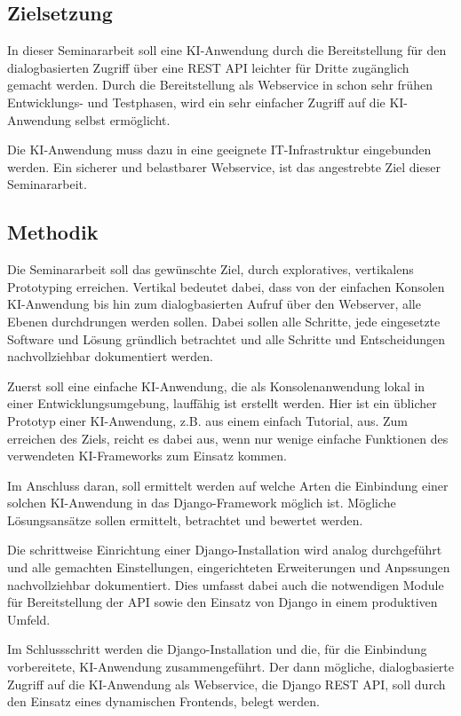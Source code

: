 \documentclass[12pt,oneside,titlepage,listof=totoc,bibliography=totoc]{scrartcl}
\begin{document}
\subsection{Zielsetzung}

In dieser Seminararbeit soll eine \ac{KI}-Anwendung durch die Bereitstellung für den dialogbasierten Zugriff über eine REST API leichter für Dritte zugänglich gemacht werden. Durch die Bereitstellung als Webservice in schon sehr frühen Entwicklungs- und Testphasen, wird ein sehr einfacher Zugriff auf die KI-Anwendung selbst ermöglicht. 

Die \ac{KI}-Anwendung muss dazu in eine geeignete IT-Infrastruktur eingebunden werden. Ein sicherer und belastbarer Webservice, ist das angestrebte Ziel dieser Seminararbeit. 


\subsection{Methodik}

Die Seminararbeit soll das gewünschte Ziel, durch exploratives, vertikalens Prototyping erreichen. Vertikal bedeutet dabei, dass von der einfachen Konsolen KI-Anwendung bis hin zum dialogbasierten Aufruf über den Webserver, alle Ebenen durchdrungen werden sollen. Dabei sollen alle Schritte, jede eingesetzte Software und Lösung gründlich betrachtet und alle Schritte und Entscheidungen nachvollziehbar dokumentiert werden.

Zuerst soll eine einfache KI-Anwendung, die als Konsolenanwendung lokal in einer Entwicklungsumgebung, lauffähig ist erstellt werden. Hier ist ein üblicher Prototyp einer KI-Anwendung, z.B. aus einem einfach Tutorial, aus. Zum erreichen des Ziels, reicht es dabei aus, wenn nur wenige einfache Funktionen des verwendeten KI-Frameworks zum Einsatz kommen.

Im Anschluss daran, soll ermittelt werden auf welche Arten die Einbindung einer solchen KI-Anwendung in das Django-Framework möglich ist. Mögliche Lösungsansätze sollen ermittelt, betrachtet und bewertet werden. 

Die schrittweise Einrichtung einer Django-Installation wird analog durchgeführt und alle gemachten Einstellungen, eingerichteten Erweiterungen und Anpssungen nachvollziehbar dokumentiert. Dies umfasst dabei auch die notwendigen Module für Bereitstellung der API sowie den Einsatz von Django in einem produktiven Umfeld. 

Im Schlussschritt werden die Django-Installation und die, für die Einbindung vorbereitete, KI-Anwendung zusammengeführt. Der dann mögliche, dialogbasierte Zugriff auf die KI-Anwendung als Webservice, die Django REST API, soll durch den Einsatz eines dynamischen Frontends, belegt werden. 
\end{document}
